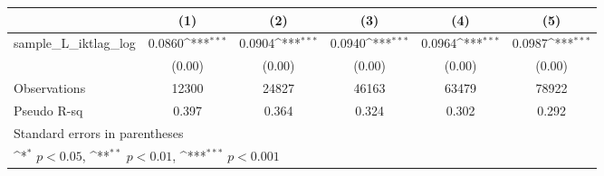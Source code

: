{
\def\sym#1{\ifmmode^{#1}\else\(^{#1}\)\fi}
\begin{tabular}{l*{5}{c}}
\hline\hline
          &\multicolumn{1}{c}{(1)}         &\multicolumn{1}{c}{(2)}         &\multicolumn{1}{c}{(3)}         &\multicolumn{1}{c}{(4)}         &\multicolumn{1}{c}{(5)}         \\
\hline
sample\_L\_iktlag\_log&   0.0860\sym{***}&   0.0904\sym{***}&   0.0940\sym{***}&   0.0964\sym{***}&   0.0987\sym{***}\\
          &   (0.00)         &   (0.00)         &   (0.00)         &   (0.00)         &   (0.00)         \\
\hline
Observations&    12300         &    24827         &    46163         &    63479         &    78922         \\
Pseudo R-sq&    0.397         &    0.364         &    0.324         &    0.302         &    0.292         \\
\hline\hline
\multicolumn{6}{l}{\footnotesize Standard errors in parentheses}\\
\multicolumn{6}{l}{\footnotesize \sym{*} \(p<0.05\), \sym{**} \(p<0.01\), \sym{***} \(p<0.001\)}\\
\end{tabular}
}
